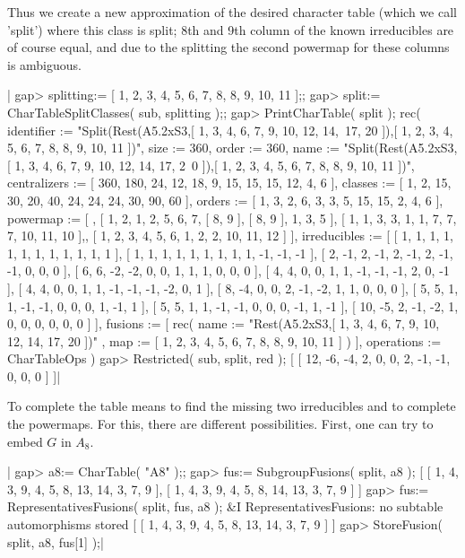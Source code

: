 Thus we create a  new approximation of the desired character table (which
we call 'split')  where  this class  is split; 8th and 9th  column of the
known  irreducibles are  of  course equal, and due  to the splitting  the
second powermap for these columns is ambiguous.

|    gap> splitting:= [ 1, 2, 3, 4, 5, 6, 7, 8, 8, 9, 10, 11 ];;
    gap> split:= CharTableSplitClasses( sub, splitting );;
    gap> PrintCharTable( split );
    rec( identifier := "Split(Rest(A5.2xS3,[ 1, 3, 4, 6, 7, 9, 10, 12, 14,\
     17, 20 ]),[ 1, 2, 3, 4, 5, 6, 7, 8, 8, 9, 10, 11 ])", size :=
    360, order :=
    360, name := "Split(Rest(A5.2xS3,[ 1, 3, 4, 6, 7, 9, 10, 12, 14, 17, 2\
    0 ]),[ 1, 2, 3, 4, 5, 6, 7, 8, 8, 9, 10, 11 ])", centralizers :=
    [ 360, 180, 24, 12, 18, 9, 15, 15, 15, 12, 4, 6 ], classes :=
    [ 1, 2, 15, 30, 20, 40, 24, 24, 24, 30, 90, 60 ], orders :=
    [ 1, 3, 2, 6, 3, 3, 5, 15, 15, 2, 4, 6 ], powermap :=
    [ , [ 1, 2, 1, 2, 5, 6, 7, [ 8, 9 ], [ 8, 9 ], 1, 3, 5 ],
      [ 1, 1, 3, 3, 1, 1, 7, 7, 7, 10, 11, 10 ],,
      [ 1, 2, 3, 4, 5, 6, 1, 2, 2, 10, 11, 12 ] ], irreducibles :=
    [ [ 1, 1, 1, 1, 1, 1, 1, 1, 1, 1, 1, 1 ],
      [ 1, 1, 1, 1, 1, 1, 1, 1, 1, -1, -1, -1 ],
      [ 2, -1, 2, -1, 2, -1, 2, -1, -1, 0, 0, 0 ],
      [ 6, 6, -2, -2, 0, 0, 1, 1, 1, 0, 0, 0 ],
      [ 4, 4, 0, 0, 1, 1, -1, -1, -1, 2, 0, -1 ],
      [ 4, 4, 0, 0, 1, 1, -1, -1, -1, -2, 0, 1 ],
      [ 8, -4, 0, 0, 2, -1, -2, 1, 1, 0, 0, 0 ],
      [ 5, 5, 1, 1, -1, -1, 0, 0, 0, 1, -1, 1 ],
      [ 5, 5, 1, 1, -1, -1, 0, 0, 0, -1, 1, -1 ],
      [ 10, -5, 2, -1, -2, 1, 0, 0, 0, 0, 0, 0 ] ], fusions := [ rec(
          name := "Rest(A5.2xS3,[ 1, 3, 4, 6, 7, 9, 10, 12, 14, 17, 20 ])"
           ,
          map := [ 1, 2, 3, 4, 5, 6, 7, 8, 8, 9, 10, 11 ] )
     ], operations := CharTableOps )
    gap> Restricted( sub, split, red );
    [ [ 12, -6, -4, 2, 0, 0, 2, -1, -1, 0, 0, 0 ] ]|

To  complete the table means to  find the missing two irreducibles and to
complete  the powermaps.   For this, there are  different  possibilities.
First, one can try to embed $G$ in $A_8$.

|    gap> a8:= CharTable( "A8" );;
    gap> fus:= SubgroupFusions( split, a8 );
    [ [ 1, 4, 3, 9, 4, 5, 8, 13, 14, 3, 7, 9 ],
      [ 1, 4, 3, 9, 4, 5, 8, 14, 13, 3, 7, 9 ] ]
    gap> fus:= RepresentativesFusions( split, fus, a8 );
    &I RepresentativesFusions: no subtable automorphisms stored
    [ [ 1, 4, 3, 9, 4, 5, 8, 13, 14, 3, 7, 9 ] ]
    gap> StoreFusion( split, a8, fus[1] );|

